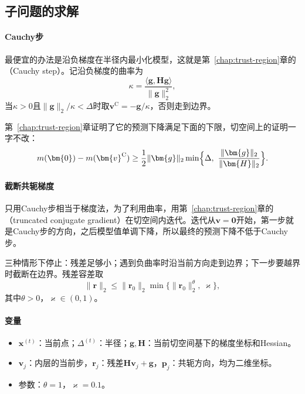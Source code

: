 \subsection{子问题的求解}
\label{sec:mfo-rtr-subproblem}

\paragraph{Cauchy步}
最便宜的办法是沿负梯度在半径内最小化模型，这就是第~\ref{chap:trust-region}章的（Cauchy step）。记沿负梯度的曲率为
\[
 \kappa=\frac{\langle\bm{g},\bm{H}\bm{g}\rangle}{\lVert\bm{g}\rVert_2^2},
\]
当$\kappa>0$且$\lVert\bm{g}\rVert_2/\kappa<\Delta$时取$\bm{v}^{\mathrm{C}}=-\bm{g}/\kappa$，否则走到边界。

第~\ref{chap:trust-region}章证明了它的预测下降满足下面的下限，切空间上的证明一字不改：
\begin{equation}
 m(\bm{0})-m(\bm{v}^{\mathrm{C}})\geq\frac12\lVert\bm{g}\rVert_2\min\Bigl\{\Delta,\ \frac{\lVert\bm{g}\rVert_2}{\lVert\bm{H}\rVert_2}\Bigr\}.
 \label{eq:mfo-cauchy-decrease}
\end{equation}

\paragraph{截断共轭梯度}
只用Cauchy步相当于梯度法，为了利用曲率，用第~\ref{chap:trust-region}章的（truncated conjugate gradient）在切空间内迭代。迭代从$\bm{v}=\bm{0}$开始，第一步就是Cauchy步的方向，之后模型值单调下降，所以最终的预测下降不低于Cauchy步。

三种情形下停止：残差足够小；遇到负曲率时沿当前方向走到边界；下一步要越界时截断在边界。残差容差取
\begin{equation}
 \lVert\bm{r}\rVert_2\leq\lVert\bm{r}_0\rVert_2\min\bigl\{\lVert\bm{r}_0\rVert_2^{\theta},\ \varkappa\bigr\},
 \label{eq:mfo-rtr-forcing}
\end{equation}
其中$\theta>0$，$\varkappa\in(0,1)$。

\paragraph{变量}
\begin{itemize}
 \item $\bm{x}^{(t)}$：当前点；$\Delta^{(t)}$：半径；$\bm{g},\bm{H}$：当前切空间基下的梯度坐标和Hessian。
 \item $\bm{v}_j$：内层的当前步，$\bm{r}_j$：残差$\bm{H}\bm{v}_j+\bm{g}$，$\bm{p}_j$：共轭方向，均为二维坐标。
 \item 参数：$\theta=1$，$\varkappa=0.1$。
\end{itemize}

